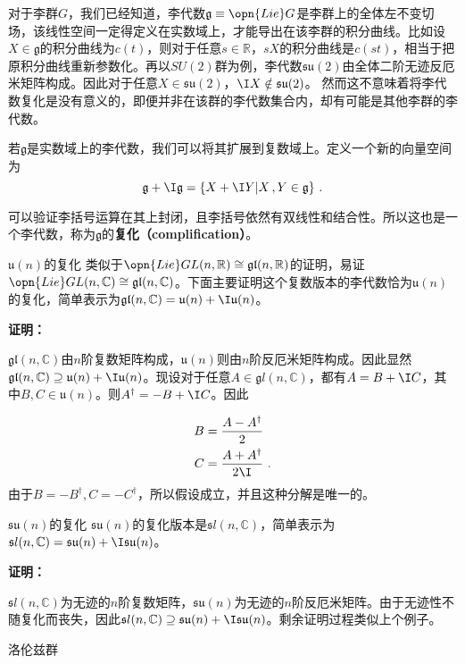 
对于李群$G$，我们已经知道，李代数$\mathfrak g\equiv \opn{Lie} G$是李群上的全体左不变切场，该线性空间一定得定义在实数域上，才能导出在该李群的积分曲线。比如设$X\in \mathfrak g$的积分曲线为$c(t)$，则对于任意$s\in \mathbb R$，$sX$的积分曲线是$c(st)$，相当于把原积分曲线重新参数化。再以$SU(2)$群为例，李代数$\mathfrak{su}(2)$由全体二阶无迹反厄米矩阵构成。因此对于任意$X\in \mathfrak{su}(2)$，$\I X\notin \mathfrak{su}(2)$。
然而这不意味着将李代数复化是没有意义的，即便并非在该群的李代数集合内，却有可能是其他李群的李代数。
\begin{definition}{}
若$\mathfrak g$是实数域上的李代数，我们可以将其扩展到复数域上。定义一个新的向量空间为
\begin{equation}
\mathfrak g+\I \mathfrak g=\{X+\I Y|X\,,Y\in\mathfrak g\}~.
\end{equation}
\end{definition}
可以验证李括号运算在其上封闭，且李括号依然有双线性和结合性。所以这也是一个李代数，称为$\mathfrak g$的\textbf{复化（complification）}。
\begin{example}{$\mathfrak u(n)$的复化}
类似于$\opn{Lie}GL(n,\mathbb R)\cong \mathfrak{gl}(n,\mathbb R)$的证明，易证$\opn{Lie}GL(n,\mathbb C)\cong \mathfrak{gl}(n,\mathbb C)$。下面主要证明这个复数版本的李代数恰为$\mathfrak u(n)$的复化，简单表示为$\mathfrak{gl}(n,\mathbb C)=\mathfrak u(n)+\I \mathfrak u(n)$。

\textbf{证明：}

$\mathfrak{gl}(n,\mathbb C)$由$n$阶复数矩阵构成，$\mathfrak u(n)$则由$n$阶反厄米矩阵构成。因此显然$\mathfrak{gl}(n,\mathbb C)\supseteq \mathfrak u(n)+\I \mathfrak u(n)$。现设对于任意$A\in \mathfrak gl(n,\mathbb C)$，都有$A=B+\I C$，其中$B,C\in \mathfrak u(n)$。则$A^{\dagger}=-B+\I C$。因此

\begin{equation}
\begin{aligned}
B&=\frac{A-A^{\dagger}}{2}\\
C&= \frac{A+A^{\dagger}}{2\I}~.
\end{aligned}
\end{equation}
由于$B=-B^{\dagger},C=-C^{\dagger}$，所以假设成立，并且这种分解是唯一的。

\end{example}
\begin{example}{$\mathfrak {su}(n)$的复化}
$\mathfrak {su}(n)$的复化版本是$\mathfrak sl(n,\mathbb C)$，简单表示为$\mathfrak sl(n,\mathbb C)=\mathfrak {su}(n)+\I \mathfrak {su}(n)$。

\textbf{证明：}

$\mathfrak sl(n,\mathbb C)$为无迹的$n$阶复数矩阵，$\mathfrak {su}(n)$为无迹的$n$阶反厄米矩阵。由于无迹性不随复化而丧失，因此$\mathfrak sl(n,\mathbb C)\supseteq \mathfrak {su}(n)+\I \mathfrak {su}(n)$。剩余证明过程类似上个例子。
\end{example}
\begin{example}{洛伦兹群}

\end{example}